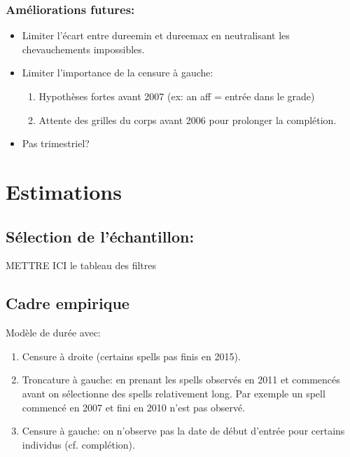\documentclass[11pt,a4paper]{article}
\begin{document}
\subsubsection*{Améliorations futures:}

\begin{itemize}[leftmargin=1cm ,parsep=0cm,itemsep=0cm,topsep=0cm] 
\item Limiter l'écart entre dureemin et dureemax en neutralisant les chevauchements impossibles. 
\item Limiter l'importance de la censure à gauche: 
\begin{enumerate}[leftmargin=1cm ,parsep=0cm,itemsep=0cm,topsep=0cm] 
\item Hypothèses fortes avant 2007 (ex: an aff = entrée dans le grade)
\item Attente des grilles du corps avant 2006 pour prolonger la complétion. 
\end{enumerate}

 \item Pas trimestriel? 
\end{itemize}


\section{Estimations}


\subsection*{Sélection de l'échantillon:}

METTRE ICI le tableau des filtres


\subsection*{Cadre empirique}

Modèle de durée avec: 
\begin{enumerate}[leftmargin=1cm ,parsep=0cm,itemsep=0cm,topsep=0cm] 
\item Censure à droite (certains spells pas finis en 2015). 
\item Troncature à gauche: en prenant les spells observés en 2011 et commencés avant on sélectionne des spells relativement long. Par exemple un spell commencé en 2007 et fini en 2010 n'est pas observé. 
\item Censure à gauche: on n'observe pas la date de début d'entrée pour certains individus (cf. complétion). 
\end{enumerate}
\end{document}
